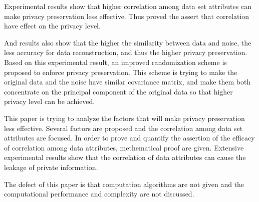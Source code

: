 \documentclass[12pt]{article}
\begin{document}
Experimental results show that higher correlation among data set
attributes can make privacy preservation less effective. Thus proved
the assert that correlation have effect on the privacy level. 

And results also show that the higher the similarity between data
and noise, the less accuracy for data reconstruction, and thus the
higher privacy preservation. Based on this experimental result, an
improved randomization scheme is proposed to enforce privacy
preservation. This scheme is trying to make the original data and the
noise have similar covariance matrix, and make them both concentrate
on the principal component of the original data so that higher privacy
level can be achieved. 

This paper is trying to analyze the factors that will make privacy
preservation less effective. Several factors are proposed and the
correlation among data set attributes are focused. In order to prove
and quantify the assertion of the efficacy of correlation among data
attributes, methematical proof are given. Extensive experimental
results show that the correlation of data attributes can cause the
leakage of private information. 

The defect of this paper is that computation algorithms are not given
and the computational performance and complexity are not discussed. 
\end{document}
